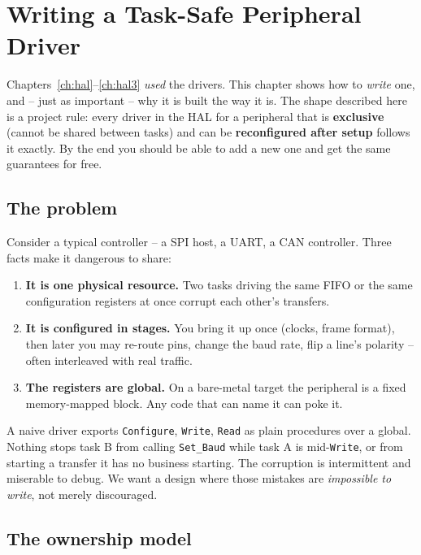 \chapter{Writing a Task-Safe Peripheral Driver}
\label{ch:driver-design}

Chapters~\ref{ch:hal}--\ref{ch:hal3} \emph{used} the drivers. This chapter shows
how to \emph{write} one, and -- just as important -- why it is built the way it
is. The shape described here is a project rule: every driver in the HAL for a
peripheral that is \textbf{exclusive} (cannot be shared between tasks) and can be
\textbf{reconfigured after setup} follows it exactly. By the end you should be
able to add a new one and get the same guarantees for free.

\section{The problem}

Consider a typical controller -- a SPI host, a UART, a CAN controller. Three
facts make it dangerous to share:

\begin{enumerate}
\item \textbf{It is one physical resource.} Two tasks driving the same FIFO or
  the same configuration registers at once corrupt each other's transfers.
\item \textbf{It is configured in stages.} You bring it up once (clocks, frame
  format), then later you may re-route pins, change the baud rate, flip a line's
  polarity -- often interleaved with real traffic.
\item \textbf{The registers are global.} On a bare-metal target the peripheral is
  a fixed memory-mapped block. Any code that can name it can poke it.
\end{enumerate}

A naive driver exports \texttt{Configure}, \texttt{Write}, \texttt{Read} as plain
procedures over a global. Nothing stops task B from calling \texttt{Set\_Baud}
while task A is mid-\texttt{Write}, or from starting a transfer it has no business
starting. The corruption is intermittent and miserable to debug. We want a design
where those mistakes are \emph{impossible to write}, not merely discouraged.

\section{The ownership model}

